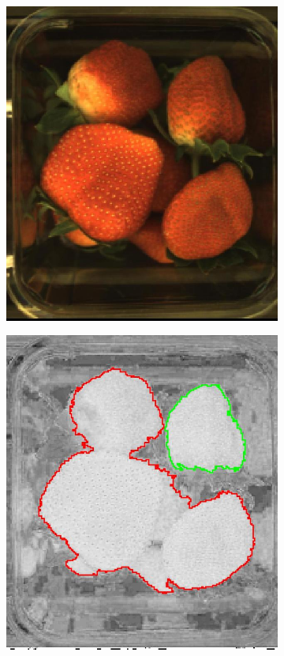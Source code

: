 \documentclass[fleqn,twoside]{article}
\begin{document}
\begin{figure}[ht]
	\centering
	\begin{subfigure}{.25\textwidth}
		\centering
		\includegraphics[width=.9\linewidth]{zoom_image.jpg}
		\caption{}
		\label{fig:yellow_white}
	\end{subfigure}%
	\begin{subfigure}{.25\textwidth}
		\centering
		\includegraphics[width=.9\linewidth]{hsv_contour.jpg}

\end{subfigure}
\end{figure}
\end{document}
